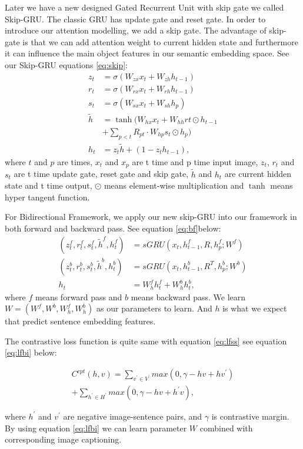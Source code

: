 \documentclass[11pt]{article}
\begin{document}
Later we have a new designed Gated Recurrent Unit with skip gate we called Skip-GRU. The classic GRU\cite{DBLP:journals/corr/ChungGCB14} has update gate and reset gate. In order to introduce our attention modelling, we add a skip gate. The advantage of skip-gate is that we can add attention weight to current hidden state and furthermore it can influence the main object features in our semantic embedding space. See our Skip-GRU equations \ref{eq:skip}:
\begin{equation}
\begin{aligned}
z_t &= \sigma(W_{zx}x_{t} + W_{zh}h_{t-1}) \\
r_t &= \sigma(W_{rx}x_{t} + W_{rh}h_{t-1}) \\
s_t &= \sigma(W_{sx}x_{t} + W_{sh}h_{p}) \\
\tilde{h} &= \tanh(W_{hx}x_{t} + W_{hh}r{t} \odot h_{t-1}\\
		 & + \sum_{p<t} R_{pt} \cdot W_{hp}s_{t} \odot h_{p}) \\
h_{t} &= z_{t}\tilde{h} + (1-z_{t}h_{t-1}),
\end{aligned}
\label{eq:skip}
\end{equation}  
where $t$ and $p$ are times, $x_t$ and $x_p$ are t time and p time input image, $z_t$, $r_t$ and $s_t$ are t time update gate, reset gate and skip gate, $\tilde{h}$ and $h_t$ are current hidden state and t time output, $\odot$ means element-wise multiplication and $\tanh$ means hyper tangent function.

For Bidirectional Framework, we apply our new skip-GRU into our framework in both forward and backward pass. See equation \ref{eq:bf}below:
\begin{equation}
\begin{aligned}
(z_{t}^{f}, r_{t}^{f}, s_{t}^{f}, \tilde{h}^{f}, h_{t}^{f}) &= sGRU(x_{t}, h_{t-1}^{f}, R, h_{p}^{f}; W^{f})\\
(z_{t}^{b}, r_{t}^{b}, s_{t}^{b}, \tilde{h}^{b}, h_{t}^{b}) &= sGRU(x_{t}, h_{t-1}^{b}, R^{T}, h_{p}^{b}; W^{b})\\
h_{t} &= W_{h}^{f}h_{t}^{f} + W_{h}^{b}h_{t}^{b},
\end{aligned}
\label{eq:bf}
\end{equation} 
where $f$ means forward pass and $b$ means backward pass. We learn $W = (W^{f}, W^{b}, W_{h}^{f}, W_{h}^{b})$ as our parameters to learn. And $h$ is what we expect that predict sentence embedding features. 

The contrastive loss function is quite same with equation \ref{eq:lfss} see equation \ref{eq:lfbi} below:
\begin{small}
\begin{equation}
\begin{aligned}
C^{cpt}(h,v) = \sum_{v^{'} \in V^{'}} max(0, \gamma -hv + hv^{'}) \\
				 + \sum_{h^{'} \in H^{'}} max(0, \gamma -hv + h^{'}v),
\end{aligned}
\label{eq:lfbi}
\end{equation}
\end{small}
where $h^{'}$ and $v^{'}$ are negative image-sentence pairs, and $\gamma$ is contrastive margin. By using equation \ref{eq:lfbi} we can learn parameter $W$ combined with corresponding image captioning.
\end{document}
